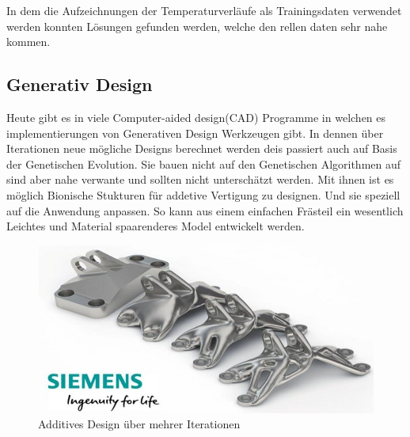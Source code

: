 In dem die Aufzeichnungen der Temperaturverläufe als Trainingsdaten verwendet werden konnten Lösungen gefunden werden, welche den rellen daten sehr nahe kommen.

\subsection{Generativ Design}
Heute gibt es in viele Computer-aided design(CAD) Programme in welchen es implementierungen von Generativen Design Werkzeugen gibt. In dennen über Iterationen neue mögliche Designs berechnet werden deis passiert auch auf Basis der Genetischen Evolution. Sie bauen nicht auf den Genetischen Algorithmen auf sind aber nahe verwante und sollten nicht unterschätzt werden. 
Mit ihnen ist es möglich Bionische Stukturen für addetive Vertigung zu designen. Und sie speziell auf die Anwendung anpassen. So kann aus einem einfachen Frästeil ein wesentlich Leichtes und Material spaarenderes Model entwickelt werden.

\noindent%
\begin{figure}[H]
  \centering  
  \includegraphics[scale=0.3]{img/Additive.png}
  \caption{Additives Design über mehrer Iterationen}
  \label{fig:Ablauf_kurz}
\end{figure}

